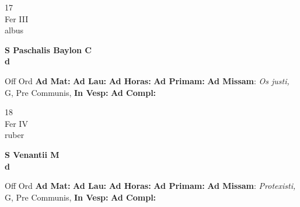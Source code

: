 \documentclass[10pt, openany]{book}
\begin{document}
    \begin{center}
        \begin{minipage}{3.5in}
            \vspace{2em}
            \begin{minipage}{0.5in}
                {\Huge 17} \\
                {\normalsize Fer III} \\
                {\normalsize albus}
            \end{minipage}
            \begin{minipage}{3.0in}
                \textbf{ \large S Paschalis Baylon C \\
                \textnormal{\normalsize d}} \\ 
            \end{minipage}
            \begin{justify}Off Ord
                \textbf{Ad Mat: }
                \textbf{Ad Lau: }
                \textbf{Ad Horas: }
                \textbf{Ad Primam: }\textbf{Ad Missam}: \textit{Os justi,} G, Pre Communis,  
                \textbf{In Vesp: }
                \textbf{Ad Compl: }
            \end{justify}
        \end{minipage}
    \end{center}

    \begin{center}
        \begin{minipage}{3.5in}
            \vspace{2em}
            \begin{minipage}{0.5in}
                {\Huge 18} \\
                {\normalsize Fer IV} \\
                {\normalsize ruber}
            \end{minipage}
            \begin{minipage}{3.0in}
                \textbf{ \large S Venantii M \\
                \textnormal{\normalsize d}} \\ 
            \end{minipage}
            \begin{justify}Off Ord
                \textbf{Ad Mat: }
                \textbf{Ad Lau: }
                \textbf{Ad Horas: }
                \textbf{Ad Primam: }\textbf{Ad Missam}: \textit{Protexisti,} G, Pre Communis,  
                \textbf{In Vesp: }
                \textbf{Ad Compl: }
            \end{justify}
        \end{minipage}
    \end{center}
\end{document}
